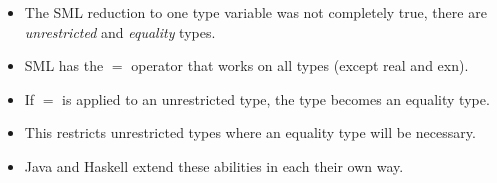 \begin{itemize}

\item The SML reduction to one type variable was not completely true, there are
\emph{unrestricted} and \emph{equality} types.

\item SML has the $=$ operator that works on all types (except real and exn).

\item If $=$ is applied to an unrestricted type, the type becomes an equality
type.

\item This restricts unrestricted types where an equality type will be
necessary.

\item Java and Haskell extend these abilities in each their own way.

\end{itemize}
